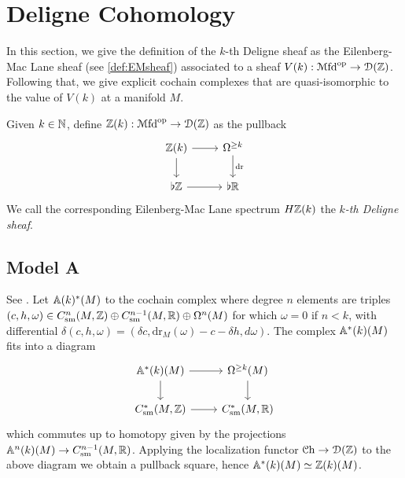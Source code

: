 \documentclass[10pt]{amsart}
\begin{document}
\section{Deligne Cohomology}

In this section, we give the definition of the $k$-th Deligne sheaf as the Eilenberg-Mac Lane sheaf (see \cref{def:EMsheaf}) associated to a sheaf $V(k):\mathcal{M}\mathrm{fd}^{\mathrm{op}}\to\mathcal{D}(\mathbb{Z})$. Following that, we give explicit cochain complexes that are quasi-isomorphic to the value of $V(k)$ at a manifold $M$. 
\begin{definition}\label{def:deligne}
  Given $k\in\mathbb{N}$, define ${\mathbb{Z}}(k):\mathcal{M}\mathrm{fd}^{\mathrm{op}}\to\mathcal{D}(\mathbb{Z})$ as the pullback 
  \[\begin{tikzcd}
    {\bZ}(k)\arrow[r]\arrow[d] & \Omega^{\geq k}\arrow[d,"\mathrm{dr}"] \\
    \flat\bZ \arrow[r] & \flat\bR
  \end{tikzcd}\]
  We call the corresponding Eilenberg-Mac Lane spectrum $H{\mathbb{Z}}(k)$ the $k$\emph{-th Deligne sheaf}.
\end{definition}
\subsection{Model A}\label{mod:A} See {\cite[\S 3.2]{hopkinssinger2005diffcoh}}. Let $\mathbb{A}(k)^*(M)$ to the cochain complex where degree $n$ elements are triples $(c,h,\omega)\in C_{\mathrm{sm}}^n(M,\mathbb{Z})\oplus C_{\mathrm{sm}}^{n-1}(M,\mathbb{R})\oplus\Omega^n(M)$ for which $\omega=0$ if $n<k$, with differential $\delta(c,h,\omega)=(\delta c,\mathrm{dr}_M(\omega)-c-\delta h,d\omega)$. The complex $\mathbb{A}^*(k)(M)$ fits into a diagram
\[\begin{tikzcd}
    \bA^*(k)(M)\arrow[d]\arrow[r] & \Omega^{\geq k}(M)\arrow[d] \\
    C_\sm^*(M,\bZ) \arrow[r] & C_\sm^*(M,\bR)
  \end{tikzcd}\]which commutes up to homotopy given by the projections $\mathbb{A}^n(k)(M)\to C_{\mathrm{sm}}^{n-1}(M,\mathbb{R})$. Applying the localization functor $\mathcal{C}\mathrm{h}\to\mathcal{D}(\mathbb{Z})$ to the above diagram we obtain a pullback square, hence $\mathbb{A}^*(k)(M)\simeq\mathbb{Z}(k)(M)$. 
\end{document}

